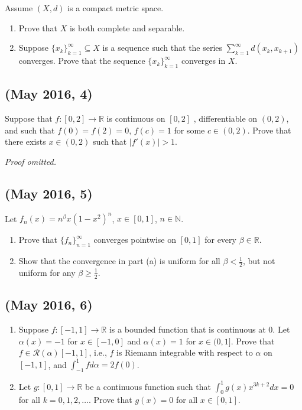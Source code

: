 Assume \((X,d)\) is a compact metric space.

\begin{enumerate}
\def\labelenumi{\arabic{enumi}.}
\item
  Prove that \(X\) is both complete and separable.
\item
  Suppose \(\{x_k\}_{k=1}^\infty \subseteq X\) is a sequence such that
  the series \(\sum_{k=1}^\infty d(x_k, x_{k+1})\) converges. Prove that
  the sequence \(\{x_k\}_{k=1}^\infty\) converges in \(X\).
\end{enumerate}

\hypertarget{may-2016-4}{%
\subsection{(May 2016, 4)}\label{may-2016-4}}

Suppose that \(f \colon [0,2] \to \mathbb{R}\) is continuous on
\([0,2]\) , differentiable on \((0,2)\), and such that
\(f(0) = f(2) = 0\), \(f(c) = 1\) for some \(c \in (0,2)\). Prove that
there exists \(x \in (0,2)\) such that \(|f'(x)| >1.\)

\emph{Proof omitted.}

\hypertarget{may-2016-5}{%
\subsection{(May 2016, 5)}\label{may-2016-5}}

Let \(f_n(x) = n^\beta x(1-x^2)^n\), \(x \in [0,1]\),
\(n \in \mathbb{N}\).

\begin{enumerate}
\def\labelenumi{\arabic{enumi}.}
\item
  Prove that \(\{f_n\}_{n=1}^\infty\) converges pointwise on \([0,1]\)
  for every \(\beta \in \mathbb{R}\).
\item
  Show that the convergence in part (a) is uniform for all
  \(\beta < \frac{1}{2}\), but not uniform for any
  \(\beta \geq \frac{1}{2}\).
\end{enumerate}

\hypertarget{may-2016-6}{%
\subsection{(May 2016, 6)}\label{may-2016-6}}

\begin{enumerate}
\def\labelenumi{\arabic{enumi}.}
\item
  Suppose \(f \colon [-1,1] \to \mathbb{R}\) is a bounded function that
  is continuous at \(0\). Let \(\alpha(x) = -1\) for \(x \in [-1,0]\)
  and \(\alpha(x)=1\) for \(x \in (0,1]\). Prove that
  \(f \in \mathcal{R}(\alpha)[-1,1]\), i.e., \(f\) is Riemann integrable
  with respect to \(\alpha\) on \([-1,1]\), and
  \(\int_{-1}^1 f d\alpha = 2f(0)\).
\item
  Let \(g \colon [0,1] \to \mathbb{R}\) be a continuous function such
  that \(\int_0^1 g(x)x^{3k+2} dx = 0\) for all \(k = 0, 1, 2, \ldots\).
  Prove that \(g(x) =0\) for all \(x \in [0,1]\).
\end{enumerate}

